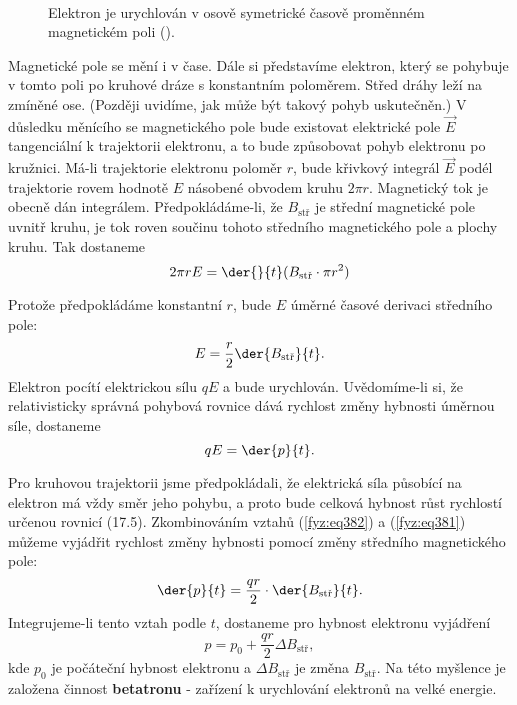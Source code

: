   \begin{figure}[hb!]
    \centering
                  \\
    \caption{Elektron je urychlován v osově symetrické časově proměnném magnetickém poli
             (\cite[s.~297]{Feynman02}).}
    \label{fyz:fig335}
  \end{figure}
  
  Magnetické pole se mění i v čase. Dále si představíme elektron, který se pohybuje v tomto poli po 
  kruhové dráze s konstantním poloměrem. Střed dráhy leží na zmíněné ose. (Později uvidíme, jak 
  může být takový pohyb uskutečněn.) V důsledku měnícího se magnetického pole bude existovat 
  elektrické pole \(\vec{E}\) tangenciální k trajektorii elektronu, a to bude způsobovat pohyb 
  elektronu po kružnici. Má-li trajektorie elektronu poloměr \(r\), bude křivkový integrál 
  \(\vec{E}\) podél trajektorie rovem hodnotě \(E\) násobené obvodem kruhu \(2\pi r\). Magnetický 
  tok je obecně dán integrálem. Předpokládáme-li, že \(B_{\text{stř}}\) je střední magnetické pole 
  uvnitř kruhu, je tok roven součinu tohoto středního magnetického pole a plochy kruhu. Tak 
  dostaneme
  \begin{equation*}
    2\pi rE = \der{}{t}(B_\text{stř}\cdot\pi r^2)
  \end{equation*}
  
  Protože předpokládáme konstantní \(r\), bude \(E\) úměrné časové derivaci středního pole:
  \begin{equation}\label{fyz:eq381}
    E = \frac{r}{2}\der{B_{\text{stř}}}{t}.
  \end{equation}
  Elektron pocítí elektrickou sílu \(qE\) a bude urychlován. Uvědomíme-li si, že relativisticky 
  správná pohybová rovnice dává rychlost změny hybnosti úměrnou síle, dostaneme
  \begin{equation}\label{fyz:eq382}
    qE = \der{p}{t}.
  \end{equation}
  
  Pro kruhovou trajektorii jsme předpokládali, že elektrická síla působící na elektron má vždy směr 
  jeho pohybu, a proto bude celková hybnost růst rychlostí určenou rovnicí (17.5). Zkombinováním 
  vztahů (\ref{fyz:eq382}) a (\ref{fyz:eq381}) můžeme vyjádřit rychlost změny hybnosti pomocí změny 
  středního magnetického pole:
  \begin{equation}\label{fyz:eq383}
    \der{p}{t} = \frac{qr}{2}\cdot\der{B_{\text{stř}}}{t}.
  \end{equation}
   Integrujeme-li tento vztah podle \(t\), dostaneme pro hybnost elektronu vyjádření
  \begin{equation}\label{fyz:eq384}
    p = p_0 + \frac{qr}{2}\Delta B_{\text{stř}},
  \end{equation}
  kde \(p_0\) je počáteční hybnost elektronu a \(\Delta B_{\text{stř}}\) je změna 
  \(B_{\text{stř}}\). Na této myšlence je založena činnost \textbf{betatronu} - zařízení k 
  urychlování elektronů na velké energie.
   
